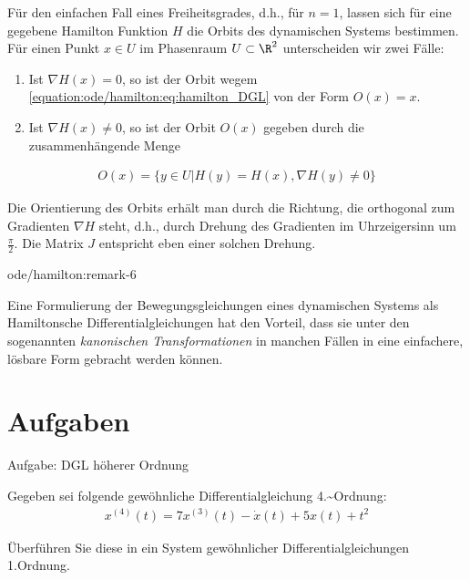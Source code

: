 \documentclass[letterpaper,10pt,english]{jupyterBook}
\begin{document}
\par
Für den einfachen Fall eines Freiheitsgrades, d.h., für \(n = 1\), lassen sich für eine gegebene Hamilton Funktion \(H\) die Orbits des dynamischen Systems bestimmen.
Für einen Punkt \(x \in U\) im Phasenraum \(U \subset \R^2\) unterscheiden wir zwei Fälle:
\begin{enumerate}

\item {} 
\par
Ist \(\nabla H(x) = 0\), so ist der Orbit wegem \eqref{equation:ode/hamilton:eq:hamilton_DGL} von der Form \(O(x) = {x}\).

\item {} 
\par
Ist \(\nabla H(x) \neq 0\), so ist der Orbit \(O(x)\) gegeben durch die zusammenhängende Menge

\end{enumerate}
\begin{align*}
O(x) = \{y \in U | H(y) = H(x), \nabla H(y) \neq 0\}
\end{align*}
\par
Die Orientierung des Orbits erhält man durch die Richtung, die orthogonal zum Gradienten \(\nabla H\) steht, d.h., durch Drehung des Gradienten im Uhrzeigersinn um \(\frac{\pi}{2}\).
Die Matrix \(J\) entspricht eben einer solchen Drehung.
\begin{remark}{}{ode/hamilton:remark-6}



\par
Eine Formulierung der Bewegungsgleichungen eines dynamischen Systems als Hamiltonsche Differentialgleichungen hat den Vorteil, dass sie unter den sogenannten \emph{kanonischen Transformationen} in manchen Fällen in eine einfachere, lösbare Form gebracht werden können.
\end{remark}


\section{Aufgaben}
\label{\detokenize{ode/ex:aufgaben}}\label{\detokenize{ode/ex::doc}}
\begin{emphBox}{}{}{Aufgabe: DGL höherer Ordnung}

\par
Gegeben sei folgende gewöhnliche Differentialgleichung 4.\textasciitilde{}Ordnung:
\begin{align*}
x^{(4)}(t) = 7 x^{(3)}(t) - \dot x(t) + 5 x(t) + t^2
\end{align*}
\par
Überführen Sie diese in ein System gewöhnlicher Differentialgleichungen 1.Ordnung.
\end{emphBox}
\end{document}
